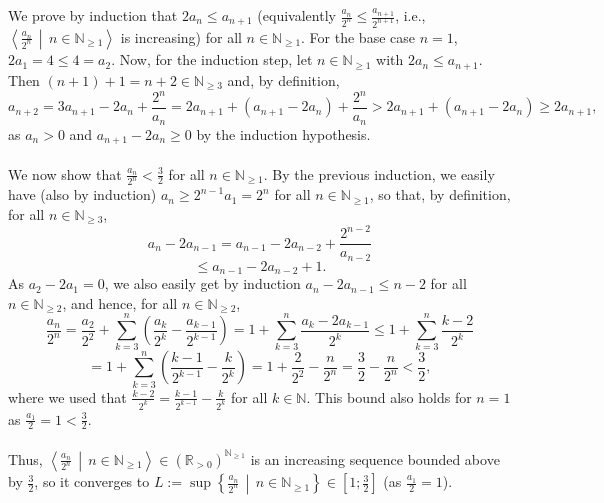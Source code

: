 \begin{solution}
    We prove by induction that \( 2a_n \leq a_{n+1} \) (equivalently \( \frac{a_n}{2^n} \leq \frac{a_{n+1}}{2^{n+1}} \), i.e., \( \left\langle \frac{a_n}{2^n} \,\middle|\, n \in \mathbb{N}_{\geq 1} \right\rangle \) is increasing) for all \( n \in \mathbb{N}_{\geq 1} \). For the base case \( n = 1 \), \( 2a_1 = 4 \leq 4 = a_2 \). Now, for the induction step, let \( n \in \mathbb{N}_{\geq 1} \) with \( 2a_n \leq a_{n+1} \). Then \( \left(n+1\right)+1 = n+2 \in \mathbb{N}_{\geq 3} \) and, by definition,
    \[
        a_{n+2} = 3a_{n+1}-2a_n+\frac{2^n}{a_n} = 2a_{n+1}+\left(a_{n+1}-2a_n\right)+\frac{2^n}{a_n} > 2a_{n+1}+\left(a_{n+1}-2a_n\right) \geq 2a_{n+1},
    \]
    as \( a_n > 0 \) and \( a_{n+1}-2a_n \geq 0 \) by the induction hypothesis.
    \\\\
    We now show that \( \frac{a_n}{2^n} < \frac{3}{2} \) for all \( n \in \mathbb{N}_{\geq 1} \). By the previous induction, we easily have (also by induction) \( a_n \geq 2^{n-1}a_1 = 2^n \) for all \( n \in \mathbb{N}_{\geq 1} \), so that, by definition, for all \( n \in \mathbb{N}_{\geq 3} \),
    \begin{equation}
        a_n-2a_{n-1} = a_{n-1}-2a_{n-2}+\frac{2^{n-2}}{a_{n-2}} \label{eq:tel11-rec}
    \end{equation}
    \[
        \leq a_{n-1}-2a_{n-2}+1.
    \]
    As \( a_2-2a_1 = 0 \), we also easily get by induction \( a_n-2a_{n-1} \leq n-2 \) for all \( n \in \mathbb{N}_{\geq 2} \), and hence, for all \( n \in \mathbb{N}_{\geq 2} \),
    \[
        \frac{a_n}{2^n} = \frac{a_2}{2^2}+\sum_{k=3}^{n} \left(\frac{a_k}{2^k}-\frac{a_{k-1}}{2^{k-1}}\right) = 1+\sum_{k=3}^{n} \frac{a_k-2a_{k-1}}{2^k} \leq 1+\sum_{k=3}^{n} \frac{k-2}{2^k}
    \]
    \[
        = 1+\sum_{k=3}^{n} \left(\frac{k-1}{2^{k-1}}-\frac{k}{2^k}\right) = 1+\frac{2}{2^2}-\frac{n}{2^n} = \frac{3}{2}-\frac{n}{2^n} < \frac{3}{2},
    \]
    where we used that \( \frac{k-2}{2^k} = \frac{k-1}{2^{k-1}}-\frac{k}{2^k} \) for all \( k \in \mathbb{N} \). This bound also holds for \( n = 1 \) as \( \frac{a_1}{2} = 1 < \frac{3}{2} \).
    \\\\
    Thus, \( \left\langle \frac{a_n}{2^n} \,\middle|\, n \in \mathbb{N}_{\geq 1} \right\rangle \in \left(\mathbb{R}_{>0}\right)^{\mathbb{N}_{\geq 1}} \) is an increasing sequence bounded above by \( \frac{3}{2} \), so it converges to \( L := \sup\left\{ \frac{a_n}{2^n} \,\middle|\, n \in \mathbb{N}_{\geq 1} \right\} \in \left[1;\frac{3}{2}\right] \) (as \( \frac{a_1}{2} = 1 \)).

\end{solution}
